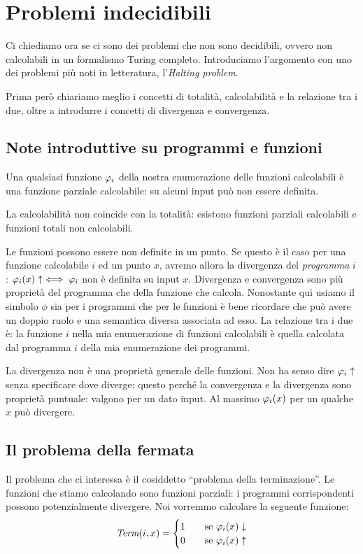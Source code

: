 \chapter{Problemi indecidibili}

Ci chiediamo ora se ci sono dei problemi che non sono decidibili, ovvero non calcolabili in un
formalismo Turing completo. Introduciamo l'argomento con uno dei problemi più noti in letteratura,
l'\textit{Halting problem}.

Prima però chiariamo meglio i concetti di totalità, calcolabilità e la relazione tra i due, oltre
a introdurre i concetti di divergenza e convergenza.

\section{Note introduttive su programmi e funzioni}

Una qualsiasi funzione $\varphi_{i}$ della nostra enumerazione delle funzioni calcolabili è una funzione
parziale calcolabile: su alcuni input può non essere definita. 

La calcolabilità non coincide con la totalità: esistono funzioni parziali calcolabili e funzioni
totali non calcolabili.

Le funzioni possono essere non definite in un punto. Se questo è il caso per una funzione
calcolabile $i$ ed un punto $x$, avremo allora la divergenza del \emph{programma} $i$: $\varphi_{i}(x)
\uparrow \iff \varphi_{i}$ non è definita su input $x$. Divergenza e convergenza sono più proprietà del
programma che della funzione che calcola. Nonostante qui usiamo il simbolo $\phi$ sia per i
programmi che per le funzioni è bene ricordare che può avere un doppio ruolo e una semantica
diversa associata ad esso. La relazione tra i due è: la funzione $i$ nella mia enumerazione di
funzioni calcolabili è quella calcolata dal programma $i$ della mia enumerazione dei programmi.

La divergenza non è una proprietà generale delle funzioni. Non ha senso dire $\varphi_{i} \uparrow$ senza
specificare dove diverge; questo perché la convergenza e la divergenza sono proprietà puntuale:
valgono per un dato input. Al massimo $\varphi_{i}(x)$ per un qualche $x$ può divergere.

\section{Il problema della fermata}

Il problema che ci interessa è il cosiddetto ``problema della terminazione''. Le funzioni che
stiamo calcolando sono funzioni parziali: i programmi corrispondenti possono potenzialmente
divergere. Noi vorremmo calcolare la seguente funzione:
\begin{equation*}
\textit{Term}(i,x) =
    \begin{cases}
        1 \quad & \text{se $\varphi_{i}(x) \downarrow$} \\
        0 \quad & \text{se $\varphi_{i}(x) \uparrow$} 
    \end{cases}
\end{equation*}


